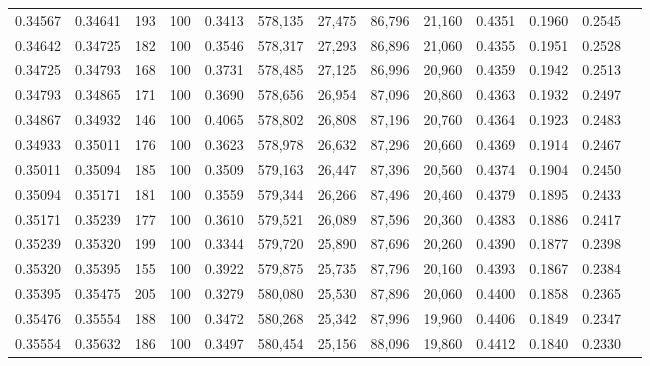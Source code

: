 \begin{tabular}{rrrrrrrrrrrrr}
0.34567 & 0.34641 &   193 & 100 &                                     0.3413 & 578,135 &  27,475 &  86,796 &  21,160 & 0.4351 & 0.1960 & 0.2545 \\
0.34642 & 0.34725 &   182 & 100 &                                     0.3546 & 578,317 &  27,293 &  86,896 &  21,060 & 0.4355 & 0.1951 & 0.2528 \\
0.34725 & 0.34793 &   168 & 100 &                                     0.3731 & 578,485 &  27,125 &  86,996 &  20,960 & 0.4359 & 0.1942 & 0.2513 \\
0.34793 & 0.34865 &   171 & 100 &                                     0.3690 & 578,656 &  26,954 &  87,096 &  20,860 & 0.4363 & 0.1932 & 0.2497 \\
0.34867 & 0.34932 &   146 & 100 &                                     0.4065 & 578,802 &  26,808 &  87,196 &  20,760 & 0.4364 & 0.1923 & 0.2483 \\
0.34933 & 0.35011 &   176 & 100 &                                     0.3623 & 578,978 &  26,632 &  87,296 &  20,660 & 0.4369 & 0.1914 & 0.2467 \\
0.35011 & 0.35094 &   185 & 100 &                                     0.3509 & 579,163 &  26,447 &  87,396 &  20,560 & 0.4374 & 0.1904 & 0.2450 \\
0.35094 & 0.35171 &   181 & 100 &                                     0.3559 & 579,344 &  26,266 &  87,496 &  20,460 & 0.4379 & 0.1895 & 0.2433 \\
0.35171 & 0.35239 &   177 & 100 &                                     0.3610 & 579,521 &  26,089 &  87,596 &  20,360 & 0.4383 & 0.1886 & 0.2417 \\
0.35239 & 0.35320 &   199 & 100 &                                     0.3344 & 579,720 &  25,890 &  87,696 &  20,260 & 0.4390 & 0.1877 & 0.2398 \\
0.35320 & 0.35395 &   155 & 100 &                                     0.3922 & 579,875 &  25,735 &  87,796 &  20,160 & 0.4393 & 0.1867 & 0.2384 \\
0.35395 & 0.35475 &   205 & 100 &                                     0.3279 & 580,080 &  25,530 &  87,896 &  20,060 & 0.4400 & 0.1858 & 0.2365 \\
0.35476 & 0.35554 &   188 & 100 &                                     0.3472 & 580,268 &  25,342 &  87,996 &  19,960 & 0.4406 & 0.1849 & 0.2347 \\
0.35554 & 0.35632 &   186 & 100 &                                     0.3497 & 580,454 &  25,156 &  88,096 &  19,860 & 0.4412 & 0.1840 & 0.2330 \\

\end{tabular}
